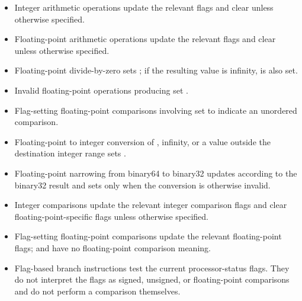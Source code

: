 \begin{itemize}
\begin{itemize}
            comparisons, and invalid numeric conversions.
      \item {} (): used by floating-point operations.
            Set when the resulting IEEE-754 value is positive or negative
            infinity. Integer operations clear  unless otherwise
            specified.
      \item {} (): used by floating-point operations.
            Set when a floating-point result is too small in magnitude to be
            represented normally in the destination floating-point format.
            Integer operations clear  unless otherwise specified.
      \item {} (): used by floating-point operations and
            conversions. Set when the mathematically exact result cannot be
            represented exactly in the destination format and rounding is
            therefore required. Integer operations clear  unless
            otherwise specified.
      \end{itemize}
\item Integer arithmetic operations update the relevant  flags
      and clear  unless otherwise specified.
\item Floating-point arithmetic operations update the relevant
       flags and clear  unless otherwise specified.
\item Floating-point divide-by-zero sets ; if the resulting value is
      infinity,  is also set.
\item Invalid floating-point operations producing  set .
\item Flag-setting floating-point comparisons involving  set
       to indicate an unordered comparison.
\item Floating-point to integer conversion of , infinity, or a
      value outside the destination integer range sets .
\item Floating-point narrowing from binary64 to binary32 updates
       according to the binary32 result and sets  only
      when the conversion is otherwise invalid.
\item Integer comparisons update the relevant integer comparison flags and
      clear floating-point-specific flags unless otherwise specified.
\item Flag-setting floating-point comparisons update the relevant
      floating-point flags;  and  have no floating-point
      comparison meaning.
\item Flag-based branch instructions test the current processor-status flags.
      They do not interpret the flags as signed, unsigned, or floating-point
      comparisons and do not perform a comparison themselves.
\end{itemize}

